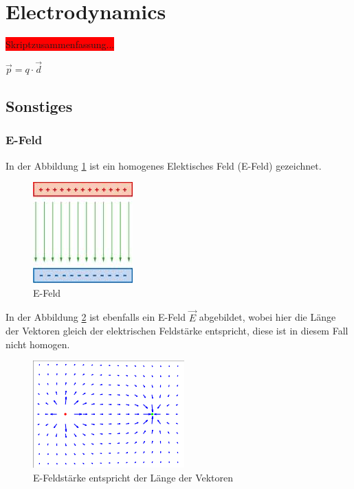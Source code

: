 \documentclass[a4paper]{scrartcl}
\begin{document}
\section{Electrodynamics}

\colorbox{red}{Skriptzusammenfassung...}

$ \vec{p}=q\cdot\vec{d} $


\subsection{Sonstiges}



\subsubsection{E-Feld}

In der Abbildung \ref{fig:E-Feld} ist ein homogenes Elektisches Feld (E-Feld) gezeichnet.

\begin{figure}[h!]
\begin{center}
\includegraphics[scale=0.5]{images/E-Feld.jpg}
\caption{E-Feld}
\label{fig:E-Feld}
\end{center}
\end{figure}

In der Abbildung \ref{fig:E-Feldstaerke} ist ebenfalls ein E-Feld $ \vec{E} $ abgebildet, wobei hier die Länge der Vektoren gleich der elektrischen Feldstärke entspricht, diese ist in diesem Fall nicht homogen.

\begin{figure}[h!]
\begin{center}
\includegraphics[scale=0.5]{images/E-Feldstaerke.png}
\caption{E-Feldstärke entspricht der Länge der Vektoren}
\label{fig:E-Feldstaerke}
\end{center}
\end{figure}
\end{document}
